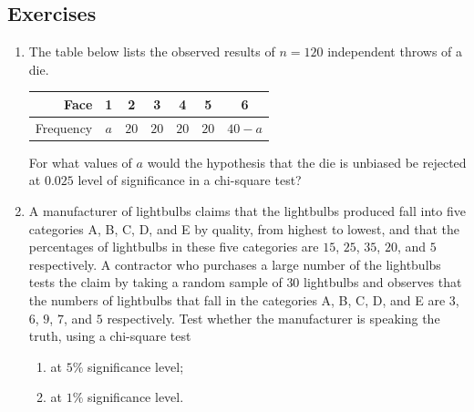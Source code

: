 \documentclass[svgnames, a5paper]{article}
\theoremstyle{definition}
\theoremstyle{remark}
\begin{document}
\subsection{Exercises}\label{subsec:Exercises2}
\begin{enumerate}
\item The table below lists the observed results of $n = 120$ independent throws of a die.

\begin{tabular}{|r||c|c|c|c|c|c|}
	\hline
	Face & 1 & 2 & 3 & 4 & 5 & 6\\
	\hline
	Frequency & $a$ & $20$ & $20$ & $20$ & $20$ & $40 - a$\\
	\hline
\end{tabular}

For what values of $a$ would the hypothesis that the die is unbiased be rejected at $0.025$ level of significance in a chi-square test?

\item A manufacturer of lightbulbs claims that the lightbulbs produced fall into five categories A, B, C, D, and E by quality, from highest to lowest, and that the percentages of lightbulbs in these five categories are $15$, $25$, $35$, $20$, and $5$ respectively. A contractor who purchases a large number of the lightbulbs tests the claim by taking a random sample of $30$ lightbulbs and observes that the numbers of lightbulbs that fall in the categories A, B, C, D, and E are $3$, $6$, $9$, $7$, and $5$ respectively. Test whether the manufacturer is speaking the truth, using a chi-square test
\begin{enumerate}[label=(\roman*)]
\item at $5\%$ significance level;
\item at $1\%$ significance level.
\end{enumerate}
\end{enumerate}
\end{document}
